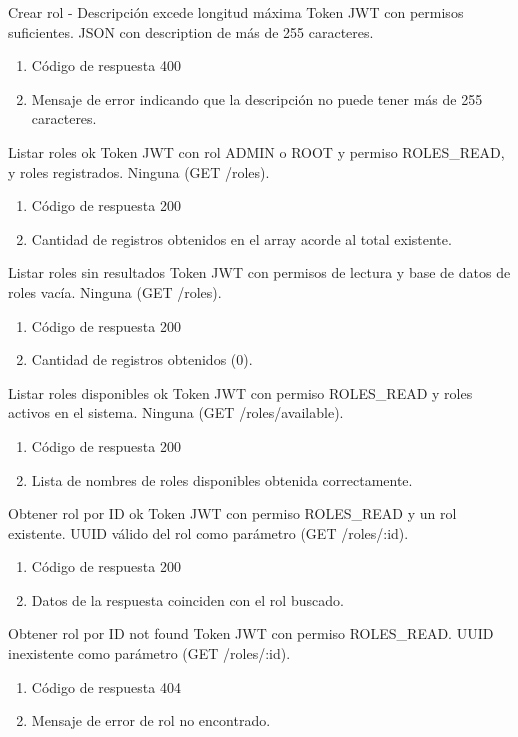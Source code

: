 {Crear rol - Descripción excede longitud máxima}
{Token JWT con permisos suficientes.}
{JSON con description de más de 255 caracteres.}
{\begin{enumerate} [leftmargin=*, nosep]
    \item Código de respuesta 400
    \item Mensaje de error indicando que la descripción no puede tener más de 255 caracteres.
\end{enumerate}}

{Listar roles ok}
{Token JWT con rol ADMIN o ROOT y permiso ROLES\_READ, y roles registrados.}
{Ninguna (GET /roles).}
{\begin{enumerate} [leftmargin=*, nosep]
    \item Código de respuesta 200
    \item Cantidad de registros obtenidos en el array acorde al total existente.
\end{enumerate}}

{Listar roles sin resultados}
{Token JWT con permisos de lectura y base de datos de roles vacía.}
{Ninguna (GET /roles).}
{\begin{enumerate} [leftmargin=*, nosep]
    \item Código de respuesta 200
    \item Cantidad de registros obtenidos (0).
\end{enumerate}}

{Listar roles disponibles ok}
{Token JWT con permiso ROLES\_READ y roles activos en el sistema.}
{Ninguna (GET /roles/available).}
{\begin{enumerate} [leftmargin=*, nosep]
    \item Código de respuesta 200
    \item Lista de nombres de roles disponibles obtenida correctamente.
\end{enumerate}}

{Obtener rol por ID ok}
{Token JWT con permiso ROLES\_READ y un rol existente.}
{UUID válido del rol como parámetro (GET /roles/:id).}
{\begin{enumerate} [leftmargin=*, nosep]
    \item Código de respuesta 200
    \item Datos de la respuesta coinciden con el rol buscado.
\end{enumerate}}

{Obtener rol por ID not found}
{Token JWT con permiso ROLES\_READ.}
{UUID inexistente como parámetro (GET /roles/:id).}
{\begin{enumerate} [leftmargin=*, nosep]
    \item Código de respuesta 404
    \item Mensaje de error de rol no encontrado.
\end{enumerate}}

